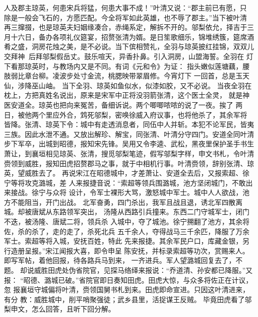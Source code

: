 人及郡主琼英，何患宋兵将猛，何患大事不成！”叶清又说：“郡主前已有愿，只
除是一般会飞石的，方愿匹配。今全将军如此英雄，也不辱了郡主。”当下被叶清
再三撺掇，也是琼英夫妇姻缘凑合，赤绳系定，解拆不开的。邬梨依允，择吉于三
月十六日，备办各项礼仪筵宴，招赘张清为婿。是日笙歌细乐，锦堆绣簇，筵席酒
肴之盛，洞房花烛之美，是不必说。当下傧相赞礼，全羽与琼英披红挂锦，双双儿
交拜神，后拜邬梨假岳丈。鼓乐喧天，异香扑鼻。引入洞房，山盟海誓。全羽在
灯下看那琼英时，与教场内又是不同。有词《元和令》为证：
指头嫩似莲塘藕，腰肢弱比章台柳。凌波步处寸金流，桃腮映带翠眉修。今宵灯下
一回首，总是玉天仙，涉降巫山岫。
当下全羽、琼英如鱼似水，似漆如胶，又不必说。
当夜全羽在枕上，方把真姓名说出，原来是宋军中正将没羽箭张清，这个医士全灵，
就是神医安道全。琼英也把向来冤苦，备细诉说。两个唧唧哝哝的说了一夜。挨了
两日，被他两个里应外合，鸩死邬梨，密唤徐威入府议事，也将他杀了，其余军将
皆降。张清、琼英下令：城中有走透消息者，同伍中人并斩。本犯不论军民，皆夷
三族。因此水泄不通。又放出解珍、解宝，同张清、叶清分守四门。安道全同叶清
步下军卒，出城到昭德，报知宋先锋。吴用又令李逵、武松，黑夜里保护圣手书生
萧让，到襄垣相见琼英、张清，搜觅邬梨笔迹，假写邬梨字样，申文书札，令叶清
赍领到威胜，报知田虎招赘郡马之事，就于中相机行事。叶清赍领，辞别张清、琼
英，望威胜去了。
再说宋江在昭德城中，才差萧让、安道全去后，又报索超、徐宁等将攻克潞城，差
人来报捷音说：“索超等领兵围潞城，池方坚闭城门，不敢出来接战。徐宁与众将
设计，令军士裸形大骂，激怒城中军士。城中人人欲战，池方不能阻当，开门出战。
北军奋勇，四门杀出，我军且战且退，诱北军四散离城。却被唐斌从东路领军突出，
汤隆从西路引兵撞来。东西二门守城军士，闭门不迭，被汤隆、唐斌二将，领兵杀
入城中，夺了城池。徐宁搠翻了池方，其余将佐，杀的杀了，走的走了，杀死北兵
五千余人，夺得战马三千余匹，降服了万余军士。索超等将入城，安抚百姓，特此
先来报捷。其余军民户口，库藏金银，另行造册呈报。”宋江闻报大喜，即令申呈
陈安抚，并标录索超等功次，赏赐来人。即写军帖，着他回报，待各路兵马到来，
一齐进兵。军人望潞城回复去了，不题。
却说威胜田虎处伪省院官，见探马络绎来报说：“乔道清、孙安都已降服。”又报：
“昭德、潞城已破。”省院官即日奏知田虎。田虎大惊，与众多将佐正在计议，忽
报襄垣守城偏将叶清，赍领国舅书札到来。田虎即命宣进。只因这叶清进来，有分
教：威胜城中，削平哨聚强徒；武乡县里，活捉谋王反贼。
毕竟田虎看了邬梨申文，怎么回答，且听下回分解。
